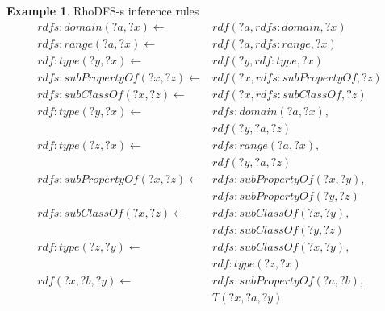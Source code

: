 \documentclass[sigconf,screen,review,natbib]{acmart}
\theoremstyle{definition}
\newtheorem{exmp}{Example}[section]
\begin{document}
\begin{exmp}{RhoDFS-s inference rules}
	\begin{align*}
		rdfs:domain(?a, ?x) \leftarrow        & rdf(?a, rdfs:domain, ?x)        \\
		rdfs:range(?a, ?x) \leftarrow         & rdf(?a, rdfs:range, ?x)         \\
		rdf:type(?y, ?x) \leftarrow           & rdf(?y, rdf:type, ?x)           \\
		rdfs:subPropertyOf(?x, ?z) \leftarrow & rdf(?x, rdfs:subPropertyOf, ?z) \\
		rdfs:subClassOf(?x, ?z) \leftarrow    & rdf(?x, rdfs:subClassOf, ?z)    \\
		rdf:type(?y, ?x) \leftarrow           & rdfs:domain(?a, ?x),            \\
		                                      & rdf(?y, ?a, ?z)                 \\
		rdf:type(?z, ?x) \leftarrow           & rdfs:range(?a, ?x),             \\
		                                      & rdf(?y, ?a, ?z)                 \\
		rdfs:subPropertyOf(?x, ?z) \leftarrow & rdfs:subPropertyOf(?x, ?y),     \\
		                                      & rdfs:subPropertyOf(?y, ?z)      \\
		rdfs:subClassOf(?x, ?z) \leftarrow    & rdfs:subClassOf(?x, ?y),        \\
		                                      & rdfs:subClassOf(?y, ?z)         \\
		rdf:type(?z, ?y) \leftarrow           & rdfs:subClassOf(?x, ?y),        \\
		                                      & rdf:type(?z, ?x)                \\
		rdf(?x, ?b, ?y) \leftarrow            & rdfs:subPropertyOf(?a, ?b),     \\
		                                      & T(?x, ?a, ?y)
	\end{align*}
	\label{program:rhodfss}
\end{exmp}
\end{document}

